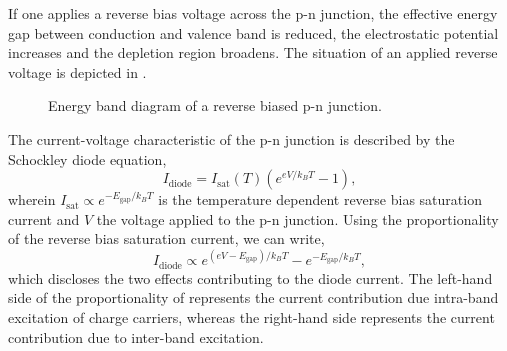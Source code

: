 If one applies a reverse bias voltage across the p-n junction, the effective energy gap between conduction and valence band is reduced, the electrostatic potential increases and the depletion region broadens.
The situation of an applied reverse voltage is depicted in .
\begin{figure}[H]
	\centering
	\caption{Energy band diagram of a reverse biased p-n junction.}\label{fig:pn_junction_reverse}
\end{figure}
The current-voltage characteristic of the p-n junction is described by the Schockley diode equation,
\begin{equation}
	I_\text{diode}=I_\text{sat}(T)\left(e^{eV/k_BT}-1\right)
	\label{eq:diode_current},
\end{equation}
wherein $I_\text{sat}\propto e^{-E_\text{gap}/k_BT}$ is the temperature dependent reverse bias saturation current and $V$ the voltage applied to the p-n junction.
Using the proportionality of the reverse bias saturation current, we can write,
\begin{equation}
	I_\text{diode}\propto e^{\left(eV-E_\text{gap}\right)/k_BT}-e^{-E_\text{gap}/k_BT}\label{eq:diode_current_prop},
\end{equation} 
which discloses the two effects contributing to the diode current.
The left-hand side of the proportionality of  represents the current contribution due intra-band excitation of charge carriers, whereas the right-hand side represents the current contribution due to inter-band excitation.


